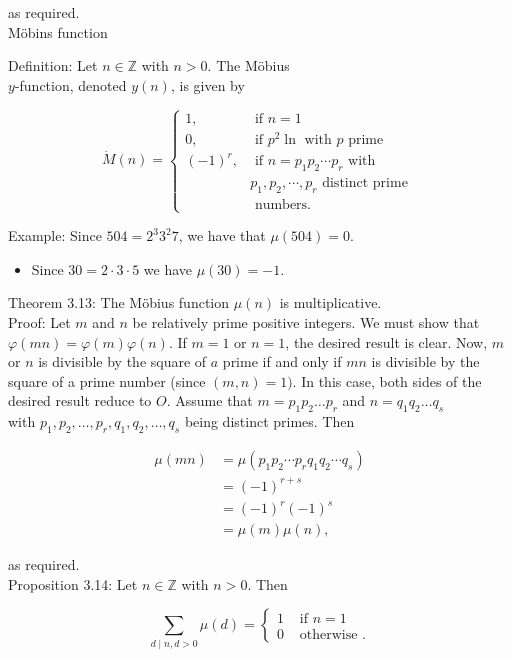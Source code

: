 \documentclass[10pt]{article}
\begin{document}
as required.\\
Möbins function

Definition: Let $n \in \mathbb{Z}$ with $n>0$. The Möbius\\
$y$-function, denoted $y(n)$, is given by

$$
\dot{M}(n)= \begin{cases}1, & \text { if } n=1 \\ 0, & \text { if } p^{2} \ln \text { with } p \text { prime } \\ (-1)^{r}, & \text { if } n=p_{1} p_{2} \cdots p_{r} \text { with } \\ & p_{1}, p_{2}, \cdots, p_{r} \text { distinct prime } \\ & \text { numbers. }\end{cases}
$$

Example: Since $504=2^{3} 3^{2} 7$, we have that $\mu(504)=0$.

\begin{itemize}
  \item Since $30=2 \cdot 3 \cdot 5$ we have $\mu(30)=-1$.
\end{itemize}

Theorem 3.13: The Möbius function $\mu(n)$ is multiplicative.\\
Proof: Let $m$ and $n$ be relatively prime positive integers. We must show that $\varphi(m n)=\varphi(m) \varphi(n)$. If $m=1$ or $n=1$, the desired result is clear. Now, $m$ or $n$ is divisible by the square of $a$ prime if and only if $m n$ is divisible by the square of a prime number (since $(m, n)=1)$. In this case, both sides of the desired result reduce to $O$. Assume that $m=p_{1} p_{2} \ldots p_{r}$ and $n=q_{1} q_{2} \ldots q_{s}$\\
with $p_{1}, p_{2}, \ldots, p_{r}, q_{1}, q_{2}, \ldots, q_{s}$ being distinct primes. Then

$$
\begin{aligned}
\mu(m n) & =\mu\left(p_{1} p_{2} \cdots p_{r} q_{1} q_{2} \cdots q_{s}\right) \\
& =(-1)^{r+s} \\
& =(-1)^{r}(-1)^{s} \\
& =\mu(m) \mu(n),
\end{aligned}
$$

as required.\\
Proposition 3.14: Let $n \in \mathbb{Z}$ with $n>0$. Then

$$
\sum_{d \mid n, d>0} \mu(d)= \begin{cases}1 & \text { if } n=1 \\ 0 & \text { otherwise } .\end{cases}
$$
\end{document}
